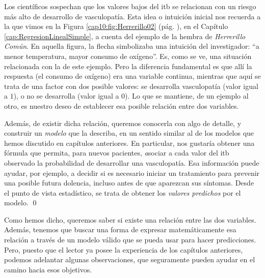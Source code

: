 \begin{ejemplo}
\noindent Los científicos sospechan que los valores bajos del itb se relacionan con un riesgo más alto de desarrollo de vasculopatía. Esta idea o intuición inicial nos recuerda a la que vimos en la Figura \ref{cap10:fig:Herrerillo02} (pág. \pageref{cap10:fig:Herrerillo02}), en el Capítulo \ref{cap:RegresionLinealSimple}, a cuenta del ejemplo de la hembra de {\em Herrerillo Común}. En aquella figura, la flecha simbolizaba una intuición del investigador: ``a menor temperatura, mayor consumo de oxígeno''. Es, como se ve, una situación relacionada con la de este ejemplo. Pero la diferencia fundamental es que allí la respuesta (el consumo de oxígeno) era una variable continua, mientras que aquí se trata de una factor con dos posible valores: se desarrolla vasculopatía (valor igual a $1$), o no se desarrolla (valor igual a $0$).  Lo que se mantiene, de un ejemplo al otro, es nuestro deseo de establecer esa posible relación entre dos variables.

Además, de existir dicha relación, queremos conocerla con algo de detalle, y construir un {\em modelo} que la describa, en un sentido similar al de los modelos que hemos discutido en capítulos anteriores. En particular, nos gustaría obtener una fórmula que permita, para nuevos pacientes, {\emph asociar a cada valor del itb observado la probabilidad de desarrollar una vasculopatía}. Esa información puede ayudar, por ejemplo, a decidir si es necesario iniciar un tratamiento para prevenir una posible futura dolencia, incluso antes de que aparezcan sus síntomas. Desde el punto de vista estadístico,  se trata de obtener los {\em valores predichos} por el modelo.
\qed
\end{ejemplo}
Como hemos dicho, queremos saber si existe una relación entre las dos variables. Además, tenemos que buscar una forma de expresar matemáticamente esa relación a través de un modelo válido que se pueda usar para hacer predicciones. Pero, puesto que el lector ya posee la experiencia de los capítulos anteriores, podemos adelantar algunas observaciones, que seguramente pueden ayudar en el camino hacia esos objetivos.
